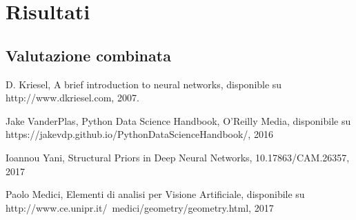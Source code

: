 \documentclass[a4paper,12pt]{report}
\begin{document}


% 
% 
\chapter{Risultati}
\label{cap3}
\section{Valutazione combinata}



% 
% 

%
%
\begin{thebibliography}{00}
%
%
D. Kriesel, A brief introduction to neural networks, disponible su
http://www.dkriesel.com, 2007. %

Jake VanderPlas, Python Data Science Handbook, O'Reilly Media, disponibile su
https://jakevdp.github.io/PythonDataScienceHandbook/, 2016

Ioannou Yani, Structural Priors in Deep Neural Networks, 10.17863/CAM.26357,
2017

Paolo Medici, Elementi di analisi per Visione Artificiale, disponibile su
http://www.ce.unipr.it/~medici/geometry/geometry.html, 2017


\end{thebibliography}
% 
\end{document}
